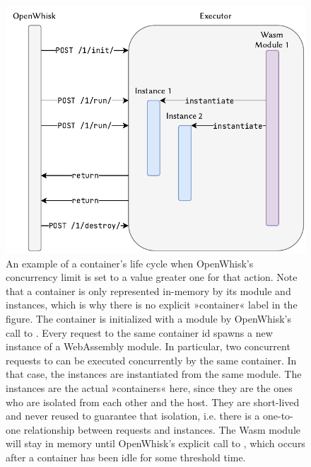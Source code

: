 \begin{figure}
    \centering
    \includegraphics{figures/OpenWhiskConcurrencyLimitGreaterOne.pdf}
    \caption{An example of a container's life cycle when OpenWhisk's concurrency limit is set to a value greater one for that action. Note that a container is only represented in-memory by its module and instances, which is why there is no explicit »container« label in the figure. The container is initialized with a module by OpenWhisk's call to . Every  request to the same container id spawns a new instance of a WebAssembly module. In particular, two concurrent requests to  can be executed concurrently by the same container. In that case, the instances are instantiated from the same module. The instances are the actual »containers« here, since they are the ones who are isolated from each other and the host. They are short-lived and never reused to guarantee that isolation, i.e. there is a one-to-one relationship between  requests and instances. The Wasm module will stay in memory until OpenWhisk's explicit call to , which occurs after a container has been idle for some threshold time.}
    \label{fig:openwhisk-concurrency-limit-greater-one}
\end{figure}


